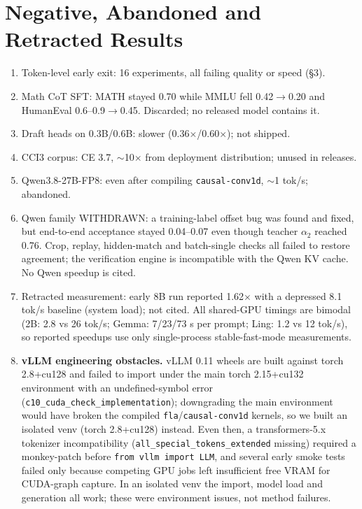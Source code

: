 \documentclass[11pt,a4paper]{article}
\begin{document}
\section{Negative, Abandoned and Retracted Results}
\begin{enumerate}[leftmargin=*]
  \item Token-level early exit: 16 experiments, all failing quality or speed (\S3).
  \item Math CoT SFT: MATH stayed 0.70 while MMLU fell 0.42$\to$0.20 and HumanEval
        0.6--0.9$\to$0.45. Discarded; no released model contains it.
  \item Draft heads on 0.3B/0.6B: slower (0.36$\times$/0.60$\times$); not shipped.
  \item CCI3 corpus: CE 3.7, $\sim$10$\times$ from deployment distribution; unused in releases.
  \item Qwen3.8-27B-FP8: even after compiling \texttt{causal-conv1d}, $\sim$1 tok/s; abandoned.
  \item Qwen family WITHDRAWN: a training-label offset bug was found and fixed, but end-to-end
        acceptance stayed 0.04--0.07 even though teacher $\alpha_2$ reached 0.76. Crop, replay,
        hidden-match and batch-single checks all failed to restore agreement; the verification
        engine is incompatible with the Qwen KV cache. No Qwen speedup is cited.
  \item Retracted measurement: early 8B run reported 1.62$\times$ with a depressed 8.1 tok/s
        baseline (system load); not cited. All shared-GPU timings are bimodal (2B: 2.8 vs 26
        tok/s; Gemma: 7/23/73 s per prompt; Ling: 1.2 vs 12 tok/s), so reported speedups use
        only single-process stable-fast-mode measurements.
  \item \textbf{vLLM engineering obstacles.} vLLM 0.11 wheels are built against torch 2.8+cu128
        and failed to import under the main torch 2.15+cu132 environment with an undefined-symbol
        error (\texttt{c10\_cuda\_check\_implementation}); downgrading the main environment would
        have broken the compiled \texttt{fla}/\texttt{causal-conv1d} kernels, so we built an isolated
        venv (torch 2.8+cu128) instead. Even then, a transformers-5.x tokenizer incompatibility
        (\texttt{all\_special\_tokens\_extended} missing) required a monkey-patch before
        \texttt{from vllm import LLM}, and several early smoke tests failed only because competing
        GPU jobs left insufficient free VRAM for CUDA-graph capture. In an isolated venv the import,
        model load and generation all work; these were environment issues, not method failures.

\end{enumerate}
\end{document}
